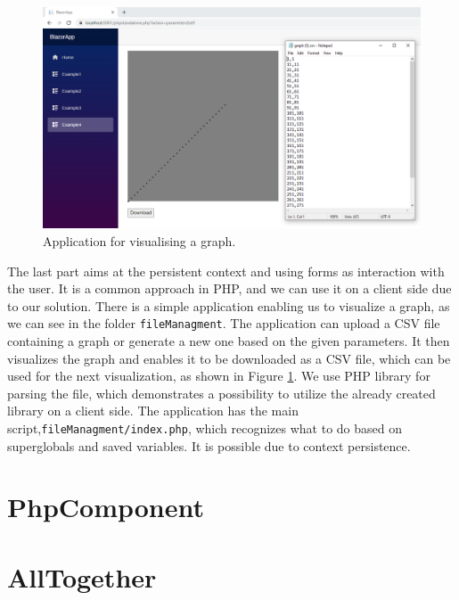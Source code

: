 \begin{figure}[!b]\centering
\includegraphics[scale=0.4]{./img/graph}
\caption{Application for visualising a graph.}
\label{img27:graph}
\end{figure} 
\par
The last part aims at the persistent context and using forms as interaction with the user.
It is a common approach in PHP, and we can use it on a client side due to our solution.
There is a simple application enabling us to visualize a graph, as we can see in the folder \texttt{fileManagment}.
The application can upload a CSV file containing a graph or generate a new one based on the given parameters.
It then visualizes the graph and enables it to be downloaded as a CSV file, which can be used for the next visualization, as shown in Figure \ref{img27:graph}.
We use PHP library for parsing the file, which demonstrates a possibility to utilize the already created library on a client side.
The application has the main script,\texttt{fileManagment/index.php}, which recognizes what to do based on superglobals and saved variables.
It is possible due to context persistence.

\section{PhpComponent}
\section{AllTogether}